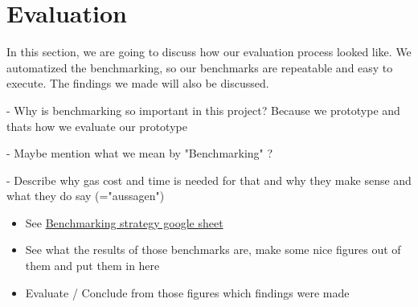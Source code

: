 \section{Evaluation}
In this section, we are going to discuss how our evaluation process looked like. We automatized the benchmarking, so our benchmarks are repeatable and easy to execute. The findings we made will also be discussed.

- Why is benchmarking so important in this project? Because we prototype and thats how we evaluate our prototype

- Maybe mention what we mean by "Benchmarking" ?

- Describe why gas cost and time is needed for that and why they make sense and what they do say (="aussagen")

\begin{itemize}
\item See \href{https://drive.google.com/drive/folders/1KhEb6TT2YXKUlSJx2sdfR44ZhWUSHnXN}{Benchmarking strategy google sheet}
\item See what the results of those benchmarks are, make some nice figures out of them and put them in here
\item Evaluate / Conclude from those figures which findings were made
\end{itemize}


